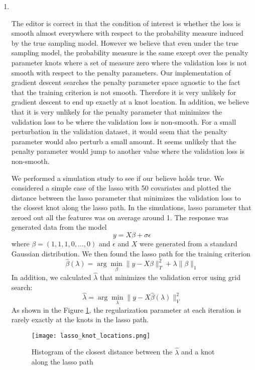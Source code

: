 \documentclass[]{article}
\newcommand{\reply}{\item[]\ }
\begin{document}
\begin{enumerate}
		\reply 
		
		The editor is correct in that the condition of interest is whether the loss is smooth almost everywhere with respect to the probability measure induced by the true sampling model. However we believe that even under the true sampling model, the probability measure is the same except over the penalty parameter knots where a set of measure zero where the validation loss is not smooth with respect to the penalty parameters. Our implementation of gradient descent searches the penalty parameter space agnostic to the fact that the training criterion is not smooth. Therefore it is very unlikely for gradient descent to end up exactly at a knot location. In addition, we believe that it is very unlikely for the penalty parameter that minimizes the validation loss to be where the validation loss is non-smooth. For a small perturbation in the validation dataset, it would seem that the penalty parameter would also perturb a small amount. It seems unlikely that the penalty parameter would jump to another value where the validation loss is non-smooth.
		
		We performed a simulation study to see if our believe holds true. We considered a simple case of the lasso with 50 covariates and plotted the distance between the lasso parameter that minimizes the validation loss to the closest knot along the lasso path. In the simulations, lasso parameter that zeroed out all the features was on average around 1. The response was generated data from the model
		$$
		y = X\beta + \sigma\epsilon
		$$
		where $\beta = (1, 1, 1, 0, ..., 0)$ and $\epsilon$ and $X$ were generated from a standard Gaussian distribution. We then found the lasso path for the training criterion
		$$
		\hat{\beta}(\lambda) = \arg\min_{\beta} \| y - X\beta \|_T^2 + \lambda \|\beta\|_1
		$$
		In addition, we calculated $\hat\lambda$ that minimizes the validation error using grid search:
		$$
		\hat{\lambda} = \arg\min_\lambda \| y - X\hat{\beta}(\lambda)\|_V^2
		$$
		As shown in the Figure \ref{fig:lasso}, the regularization parameter at each iteration is rarely exactly at the knots in the lasso path.
		
		\begin{figure}
			\label{fig:lasso}
			\caption{Histogram of the closest distance between the $\hat\lambda$ and a knot along the lasso path}
			\centering
			\texttt{[image: lasso\_knot\_locations.png]}
		\end{figure}
	\end{enumerate}
\end{document}
